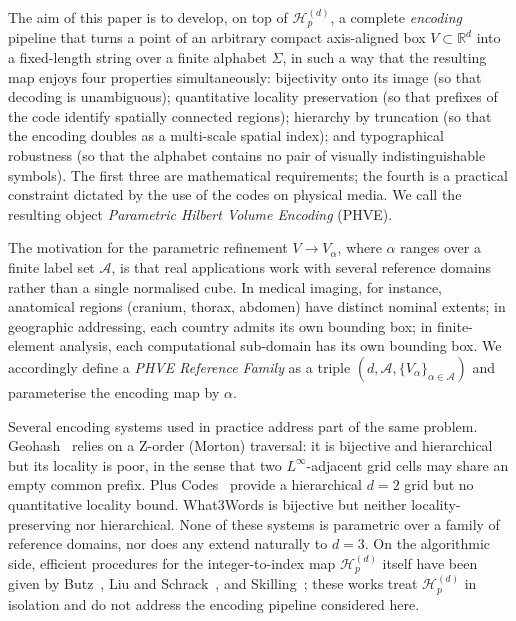\documentclass[11pt,a4paper]{article}
\theoremstyle{plain}
\theoremstyle{definition}
\theoremstyle{remark}
\newcommand{\R}{\mathbb{R}}
\begin{document}
The aim of this paper is to develop, on top of $\mathcal{H}_p^{(d)}$,
a complete \emph{encoding} pipeline that turns a point of an arbitrary
compact axis-aligned box $V\subset\R^d$ into a fixed-length string over
a finite alphabet $\Sigma$, in such a way that the resulting map enjoys
four properties simultaneously:
bijectivity onto its image (so that decoding is unambiguous);
quantitative locality preservation (so that prefixes of the code
identify spatially connected regions);
hierarchy by truncation (so that the encoding doubles as a multi-scale
spatial index); and
typographical robustness (so that the alphabet contains no pair of
visually indistinguishable symbols).
The first three are mathematical requirements; the fourth is a
practical constraint dictated by the use of the codes on physical
media. We call the resulting object \emph{Parametric Hilbert Volume
Encoding} (PHVE).

The motivation for the parametric refinement
$V \to V_\alpha$, where $\alpha$ ranges over a finite label set
$\mathcal{A}$, is that real applications work with several reference
domains rather than a single normalised cube. In medical imaging, for
instance, anatomical regions (cranium, thorax, abdomen) have distinct
nominal extents; in geographic addressing, each country admits its own
bounding box; in finite-element analysis, each computational sub-domain
has its own bounding box. We accordingly define a \emph{PHVE Reference
Family} as a triple
$(d,\mathcal{A},\{V_\alpha\}_{\alpha\in\mathcal{A}})$ and parameterise
the encoding map by $\alpha$.

Several encoding systems used in practice address part of the same
problem. Geohash~\cite{niemeyer2008} relies on a Z-order (Morton)
traversal: it is bijective and hierarchical but its locality is poor,
in the sense that two $L^\infty$-adjacent grid cells may share an
empty common prefix. Plus Codes~\cite{google2014} provide a hierarchical
$d=2$ grid but no quantitative locality bound. What3Words is bijective
but neither locality-preserving nor hierarchical. None of these systems
is parametric over a family of reference domains, nor does any extend
naturally to $d=3$. On the algorithmic side, efficient procedures for
the integer-to-index map $\mathcal{H}_p^{(d)}$ itself have been given
by Butz~\cite{butz1971}, Liu and Schrack~\cite{liu1996}, and
Skilling~\cite{skilling2004}; these works treat $\mathcal{H}_p^{(d)}$
in isolation and do not address the encoding pipeline considered here.
\end{document}
